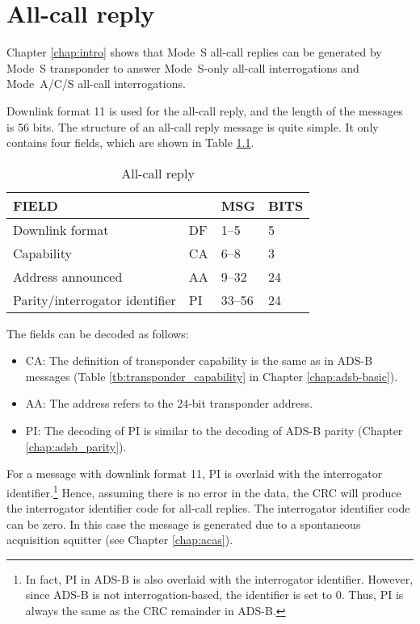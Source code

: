 \chapter{All-call reply}

Chapter \ref{chap:intro} shows that Mode~S all-call replies can be generated by Mode~S transponder to answer Mode~S-only all-call interrogations and Mode~A/C/S all-call interrogations.

Downlink format 11 is used for the all-call reply, and the length of the messages is 56 bits. The structure of an all-call reply message is quite simple. It only contains four fields, which are shown in Table \ref{tb:df11_structure}.

\begin{table}[ht]
\caption{All-call reply}
\label{tb:df11_structure}
\begin{tabular}{|l|l|l|l|}
\hline
\textbf{FIELD} & \textbf{} & \textbf{MSG} & \textbf{BITS} \\ \hline
Downlink format & DF & 1--5 & 5 \\ \hline
Capability & CA & 6--8 & 3 \\ \hline
Address announced & AA & 9--32 & 24 \\ \hline
Parity/interrogator identifier & PI & 33--56 & 24 \\ \hline
\end{tabular}
\end{table}

The fields can be decoded as follows:

\begin{itemize}
  \item CA: The definition of transponder capability is the same as in ADS-B messages (Table \ref{tb:transponder_capability} in Chapter \ref{chap:adsb-basic}).

  \item AA: The address refers to the 24-bit transponder address.

  \item PI: The decoding of PI is similar to the decoding of ADS-B parity (Chapter \ref{chap:adsb_parity}). 
\end{itemize}

For a message with downlink format 11, PI is overlaid with the interrogator identifier.\footnote{In fact, PI in ADS-B is also overlaid with the interrogator identifier. However, since ADS-B is not interrogation-based, the identifier is set to 0. Thus, PI is always the same as the CRC remainder in ADS-B.} Hence, assuming there is no error in the data, the CRC will produce the interrogator identifier code for all-call replies. The interrogator identifier code can be zero. In this case the message is generated due to a spontaneous acquisition squitter (see Chapter \ref{chap:acas}).


